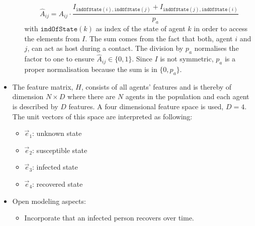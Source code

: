 \documentclass[]{article}
\newcommand{\indexOfState}[1]{\texttt{indOfState}(#1)}
\begin{document}
\begin{itemize}
\begin{itemize}
		\begin{equation}
			\hat{A}_{ij} = A_{ij}\cdot \frac{I_{\indexOfState{i}, \indexOfState{j}} + I_{\indexOfState{j}, \indexOfState{i}}}{p_a}
		\end{equation}
		with $\indexOfState{k}$ as index of the state of agent $k$ in order to access the elements from $I$. The sum comes from the fact that both, agent $i$ and $j$, can act as host during a contact. The division by $p_a$ normalises the factor to one to ensure $\hat{A}_{ij} \in \{0, 1\}$. Since $I$ is not symmetric, $p_a$ is a proper normalisation because the sum is in $\{0, p_a\}$.
	\end{itemize}
	\item The feature matrix, $H$, consists of all agents' features and is thereby of dimension $N\times D$ where there are $N$ agents in the population and each agent is described by $D$ features. A four dimensional feature space is used, $D=4$. The unit vectors of this space are interpreted as following:
	\begin{itemize}
		\item $\vec{e}_1$: unknown state
		\item $\vec{e}_2$: susceptible state
		\item $\vec{e}_3$: infected state
		\item $\vec{e}_4$: recovered state
	\end{itemize}
	\item Open modeling aspects:
	\begin{itemize}
		\item Incorporate that an infected person recovers over time.
	\end{itemize}
\end{itemize}
\end{document}
